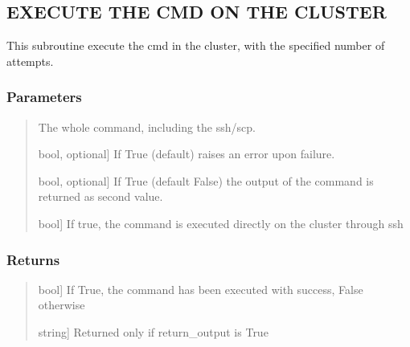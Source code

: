 \documentclass[a4paper,11pt,english]{sphinxmanual}
\begin{document}
\begin{fulllineitems}
\begin{fulllineitems}
\subsection{EXECUTE THE CMD ON THE CLUSTER}
\label{\detokenize{apireference:execute-the-cmd-on-the-cluster}}
\sphinxAtStartPar
This subroutine execute the cmd in the cluster,
with the specified number of attempts.


\subsubsection{Parameters}
\label{\detokenize{apireference:id48}}\begin{quote}
\begin{description}
\sphinxAtStartPar
The whole command, including the ssh/scp.

\sphinxlineitem{raise\_error}{[}bool, optional{]}
\sphinxAtStartPar
If True (default) raises an error upon failure.

\sphinxlineitem{return\_output}{[}bool, optional{]}
\sphinxAtStartPar
If True (default False) the output of the command is 
returned as second value.

\sphinxlineitem{on\_cluster}{[}bool{]}
\sphinxAtStartPar
If true, the command is executed directly on the cluster through ssh

\end{description}
\end{quote}


\subsubsection{Returns}
\label{\detokenize{apireference:id49}}\begin{quote}
\begin{description}
\sphinxlineitem{success}{[}bool{]}
\sphinxAtStartPar
If True, the command has been executed with success,
False otherwise

\sphinxlineitem{output}{[}string{]}
\sphinxAtStartPar
Returned only if return\_output is True

\end{description}
\end{quote}

\end{fulllineitems}



\end{fulllineitems}
\end{document}

